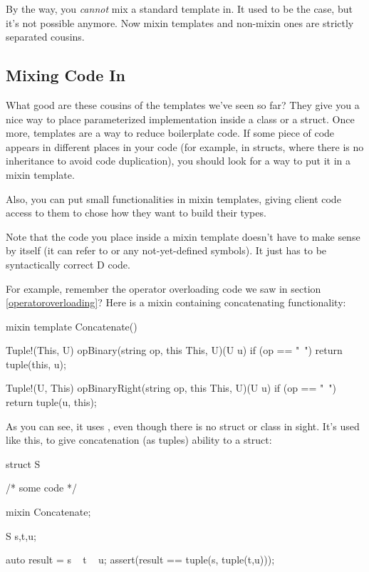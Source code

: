
By the way, you \emph{cannot} mix a standard template in. It used to be the case, but it's not possible anymore. Now mixin templates and non-mixin ones are strictly separated cousins.

\subsection{Mixing Code In}\label{mixincodein}

What good are these cousins of the templates we've seen so far? They give you a nice way to place parameterized implementation inside a class or a struct. Once more, templates are a way to reduce boilerplate code. If some piece of code appears in different places in your code (for example, in structs, where there is no inheritance to avoid code duplication), you should look for a way to put it in a mixin template.

Also, you can put small functionalities in mixin templates, giving client code access to them to chose how they want to build their types.

Note that the code you place inside a mixin template doesn't have to make sense by itself (it can refer to  or any not-yet-defined symbols). It just has to be syntactically correct D code.

For example, remember the operator overloading code we saw in section \ref{operatoroverloading}? Here is a mixin containing concatenating functionality:

\begin{dcode}
mixin template Concatenate()
{
    Tuple!(This, U) opBinary(string op, this This, U)(U u) 
    if (op == "~")
    {
        return tuple(this, u);
    }

    Tuple!(U, This) opBinaryRight(string op, this This, U)(U u) 
    if (op == "~")
    {
        return tuple(u, this);
    }
}
\end{dcode}

As you can see, it uses , even though there is no struct or class in sight. It's used like this, to give concatenation (as tuples) ability to a struct:

\begin{dcode}
struct S
{
    /* some code */

    mixin Concatenate;
}

S s,t,u;

auto result = s ~ t ~ u;
assert(result == tuple(s, tuple(t,u)));
\end{dcode}

